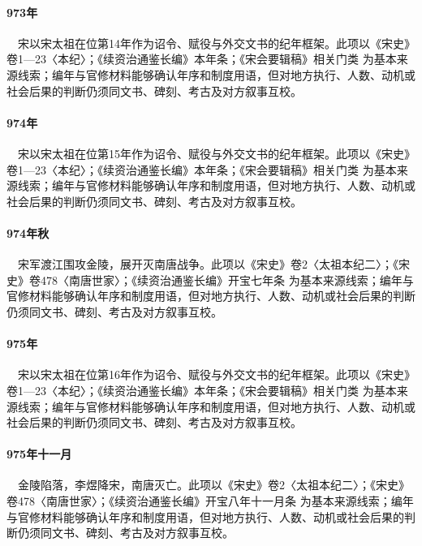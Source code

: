 \paragraph{973年}　宋以宋太祖在位第14年作为诏令、赋役与外交文书的纪年框架。此项以《宋史》卷1—23〈本纪〉；《续资治通鉴长编》本年条；《宋会要辑稿》相关门类 为基本来源线索；编年与官修材料能够确认年序和制度用语，但对地方执行、人数、动机或社会后果的判断仍须同文书、碑刻、考古及对方叙事互校。

\paragraph{974年}　宋以宋太祖在位第15年作为诏令、赋役与外交文书的纪年框架。此项以《宋史》卷1—23〈本纪〉；《续资治通鉴长编》本年条；《宋会要辑稿》相关门类 为基本来源线索；编年与官修材料能够确认年序和制度用语，但对地方执行、人数、动机或社会后果的判断仍须同文书、碑刻、考古及对方叙事互校。

\paragraph{974年秋}　宋军渡江围攻金陵，展开灭南唐战争。此项以《宋史》卷2〈太祖本纪二〉；《宋史》卷478〈南唐世家〉；《续资治通鉴长编》开宝七年条 为基本来源线索；编年与官修材料能够确认年序和制度用语，但对地方执行、人数、动机或社会后果的判断仍须同文书、碑刻、考古及对方叙事互校。

\paragraph{975年}　宋以宋太祖在位第16年作为诏令、赋役与外交文书的纪年框架。此项以《宋史》卷1—23〈本纪〉；《续资治通鉴长编》本年条；《宋会要辑稿》相关门类 为基本来源线索；编年与官修材料能够确认年序和制度用语，但对地方执行、人数、动机或社会后果的判断仍须同文书、碑刻、考古及对方叙事互校。

\paragraph{975年十一月}　金陵陷落，李煜降宋，南唐灭亡。此项以《宋史》卷2〈太祖本纪二〉；《宋史》卷478〈南唐世家〉；《续资治通鉴长编》开宝八年十一月条 为基本来源线索；编年与官修材料能够确认年序和制度用语，但对地方执行、人数、动机或社会后果的判断仍须同文书、碑刻、考古及对方叙事互校。


